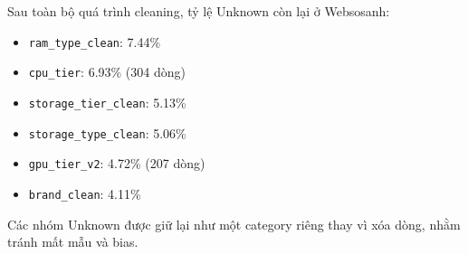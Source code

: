 Sau toàn bộ quá trình cleaning, tỷ lệ Unknown còn lại ở Websosanh:
\begin{itemize}[noitemsep]
    \item \texttt{ram\_type\_clean}: 7.44\%
    \item \texttt{cpu\_tier}: 6.93\% (304 dòng)
    \item \texttt{storage\_tier\_clean}: 5.13\%
    \item \texttt{storage\_type\_clean}: 5.06\%
    \item \texttt{gpu\_tier\_v2}: 4.72\% (207 dòng)
    \item \texttt{brand\_clean}: 4.11\%
\end{itemize}

Các nhóm Unknown được giữ lại như một category riêng thay vì xóa dòng, nhằm tránh mất mẫu và bias.
